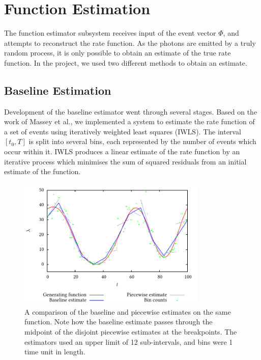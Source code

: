 \documentclass[11pt]{article}
\begin{document}
\section{Function Estimation}
\label{sec-3}

  The function estimator subsystem receives input of the event vector $\Phi$, and
  attempts to reconstruct the rate function. As the photons are emitted by a
  truly random process, it is only possible to obtain an estimate of the true
  rate function. In the project, we used two different methods to obtain an
  estimate.
\subsection{Baseline Estimation}
\label{sec-3.1}

   Development of the baseline estimator went through several stages. Based on
   the work of Massey et al.\cite{massey}, we implemented a system to estimate
   the rate function of a set of events using iteratively weighted least squares
   (IWLS). The interval $[t_0,T]$ is split into several bins, each represented
   by the number of events which occur within it. IWLS produces a linear
   estimate of the rate function by an iterative process which minimises the sum
   of squared residuals from an initial estimate of the function.

    \begin{figure}[]
    \centering
    \includegraphics[width=0.8\textwidth]{images/pcbase}

    \caption{A comparison of the baseline and piecewise estimates on the same
    function. Note how the baseline estimate passes through the midpoint of the
    disjoint piecewise estimates at the breakpoints. The estimators used an
    upper limit of 12 sub-intervals, and bins were 1 time unit in length.}

    \label{fig:basecomp}
    \end{figure}
\end{document}
